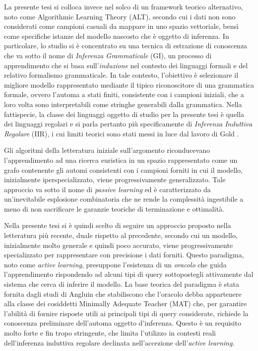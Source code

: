 La presente tesi si colloca invece nel solco di un framework teorico alternativo, noto come Algorithmic Learning Theory (ALT), secondo cui i dati non sono considerati come campioni casuali da mappare in uno spazio vettoriale, bensì come specifiche istanze del modello nascosto che è oggetto di inferenza. In particolare, lo studio si è concentrato su una tecnica di estrazione di conoscenza che va sotto il nome di \textit{Inferenza Grammaticale} (GI), un processo di apprendimento che si basa sull'\textit{induzione} nel contesto dei linguaggi formali e del relativo formalismo grammaticale. In tale contesto, l'obiettivo è selezionare il migliore modello rappresentato mediante il tipico riconoscitore di una grammatica formale, ovvero l'automa a stati finiti, consistente con i campioni iniziali, che a loro volta sono interpretabili come stringhe generabili dalla grammatica. Nella fattispecie, la classe dei linguaggi oggetto di studio per la presente tesi è quella dei linguaggi regolari e si parla pertanto più specificamente di \textit{Inferenza Induttiva Regolare} (IIR), i cui limiti teorici sono stati messi in luce dal lavoro di Gold \cite{Gold67}.

Gli algoritmi della letteratura iniziale sull'argomento riconducevano l'apprendimento ad una ricerca euristica in un spazio rappresentato come un grafo contenente gli automi consistenti con i campioni forniti in cui il modello, inizialmente iperspecializzato, viene progressivamente generalizzato. Tale approccio va sotto il nome di \textit{passive learning} ed è caratterizzato da un'inevitabile esplosione combinatoria che ne rende la complessità ingestibile a meno di non sacrificare le garanzie teoriche di terminazione e ottimalità.

Nella presente tesi si è quindi scelto di seguire un approccio proposto nella letteratura più recente, duale rispetto al precedente, secondo cui un modello, inizialmente molto generale e quindi poco accurato, viene progressivamente specializzato per rappresentare con precisione i dati forniti. Questo paradigma, noto come \textit{active learning}, presuppone l'esistenza di un \textit{oracolo} che guida l'apprendimento rispondendo ad alcuni tipi di query sottopostegli attivamente dal sistema che cerca di inferire il modello. La base teorica del paradigma è stata fornita dagli studi di Angluin \cite{Angluin87} che stabiliscono che l'oracolo debba appartenere alla classe dei cosiddetti Minimally Adequate Teacher (MAT) che, per garantire l'abilità di fornire risposte utili ai principali tipi di query considerate, richiede la conoscenza preliminare dell'automa oggetto d'inferenza.
Questo è un requisito molto forte e fin tropo stringente, che limita l'utilizzo in contesti reali dell'inferenza induttiva regolare declinata nell'accezione dell'\textit{active learning}.
 

